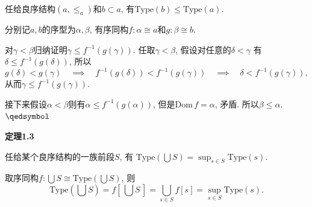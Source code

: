 \documentclass[UTF8]{ctexart}
\begin{document}
任给良序结构$(a,\leqslant_a)$和$b\subset a$,
有$\mathrm{Type}(b)\leqslant\mathrm{Type}(a)$.


分别记$a,b$的序型为$\alpha,\beta$, 有序同构$f:\alpha\cong a$和$g:\beta\cong b$.

对$\gamma<\beta$归纳证明$\gamma\leqslant f^{-1}(g(\gamma))$.
任取$\gamma<\beta$, 假设对任意的$\delta<\gamma$
有$\delta\leqslant f^{-1}(g(\delta))$, 所以
\[
    g(\delta)<g(\gamma)\quad\implies\quad f^{-1}(g(\delta))<f^{-1}(g(\gamma))
    \quad\implies\quad \delta<f^{-1}(g(\gamma)),
\]
从而$\gamma\leqslant f^{-1}(g(\gamma))$.

接下来假设$\alpha<\beta$则有$\alpha\leqslant f^{-1}(g(\alpha))$,
但是$\mathrm{Dom}\,f=\alpha$, 矛盾. 所以$\beta\leqslant\alpha$. \hfill $\qedsymbol$

\vspace{10pt}

\hypertarget{sec:定理1.3}{}
\noindent\textbf{定理1.3}

任给某个良序结构的一族前段$S$, 有
$\displaystyle\mathrm{Type}\left(\bigcup S\right)=\sup_{s\in S}\mathrm{Type}(s)$.


取序同构$\displaystyle f:\bigcup S\cong\mathrm{Type}\left(\bigcup S\right)$, 则
\begin{equation*}
    \mathrm{Type}\left(\bigcup S\right)=f\left[\,\bigcup S\,\right]=
    \bigcup_{s\in S}f[s]=\sup_{s\in S}\mathrm{Type}(s).
\tag*{\qedsymbol}\end{equation*}
\end{document}
